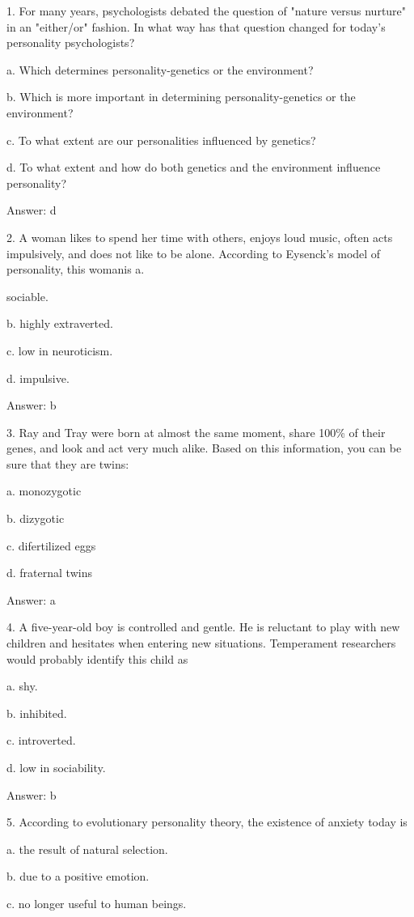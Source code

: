 \documentclass{article}
\begin{document}
1. For many years, psychologists debated the question of "nature versus nurture" in an "either/or" fashion. In what way has that question changed for today's personality psychologists?

a. Which determines personality-genetics or the environment?

b. Which is more important in determining personality-genetics or the environment?

c. To what extent are our personalities influenced by genetics?

d. To what extent and how do both genetics and the environment influence personality?

Answer: d

2. A woman likes to spend her time with others, enjoys loud music, often acts impulsively, and does not like to be alone. According to Eysenck's model of personality, this womanis a.

sociable.

b. highly extraverted.

c. low in neuroticism.

d. impulsive.

Answer: b

3. Ray and Tray were born at almost the same moment, share 100\% of their genes, and look and act very much alike. Based on this information, you can be sure that they are twins:

a. monozygotic

b. dizygotic

c. difertilized eggs

d. fraternal twins

Answer: a

4. A five-year-old boy is controlled and gentle. He is reluctant to play with new children and hesitates when entering new situations. Temperament researchers would probably identify this child as

a. shy.

b. inhibited.

c. introverted.

d. low in sociability.

Answer: b

5. According to evolutionary personality theory, the existence of anxiety today is

a. the result of natural selection.

b. due to a positive emotion.

c. no longer useful to human beings.
\end{document}
